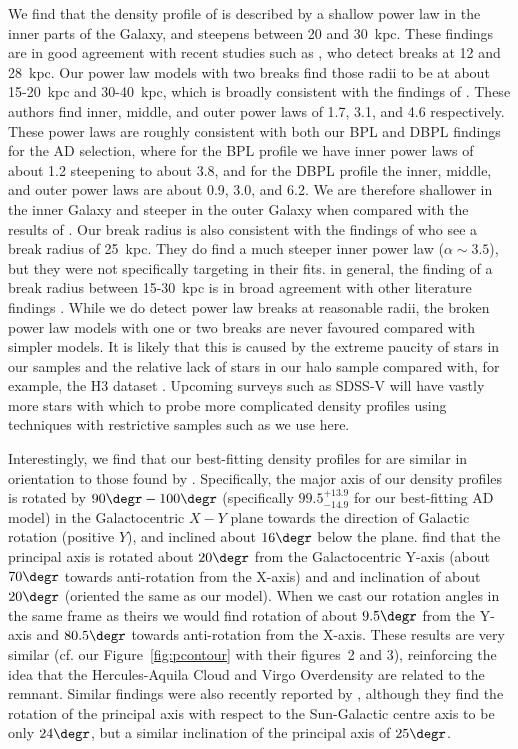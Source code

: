 We find that the density profile of \gse is described by a shallow power law in the inner parts of the Galaxy, and steepens between 20 and 30~kpc. These findings are in good agreement with recent studies such as \textcite{han22}, who detect breaks at 12 and 28~kpc. Our power law models with two breaks find those radii to be at about 15-20~kpc and 30-40~kpc, which is broadly consistent with the findings of \textcite{han22}. These authors find inner, middle, and outer power laws of 1.7, 3.1, and 4.6 respectively. These power laws are roughly consistent with both our BPL and DBPL findings for the AD selection, where for the BPL profile we have inner power laws of about 1.2 steepening to about 3.8, and for the DBPL profile the inner, middle, and outer power laws are about 0.9, 3.0, and 6.2. We are therefore shallower in the inner Galaxy and steeper in the outer Galaxy when compared with the results of \textcite{han22}. Our break radius is also consistent with the findings of \cite{mackereth20} who see a break radius of 25~kpc. They do find a much steeper inner power law ($\alpha \sim 3.5$), but they were not specifically targeting \gse in their fits. in general, the finding of a break radius between 15-30~kpc is in broad agreement with other literature findings \parencite{sesar11,deason11,xue15,deason19}. While we do detect power law breaks at reasonable radii, the broken power law models with one or two breaks are never favoured compared with simpler models. It is likely that this is caused by the extreme paucity of stars in our \gse samples and the relative lack of stars in our halo sample compared with, for example, the H3 dataset \parencite{h3}. Upcoming surveys such as SDSS-V \parencite{sdss5} will have vastly more stars with which to probe more complicated density profiles using techniques with restrictive samples such as we use here.

Interestingly, we find that our best-fitting density profiles for \gse are similar in orientation to those found by \textcite{iorio19}. Specifically, the major axis of our density profiles is rotated by $90\degr-100\degr$ (specifically $99.5^{+13.9}_{-14.9}$ for our best-fitting AD model) in the Galactocentric $X-Y$ plane towards the direction of Galactic rotation (positive $Y$), and inclined about $16\degr$ below the plane. \textcite{iorio19} find that the principal axis is rotated about $20\degr$ from the Galactocentric Y-axis (about $70\degr$ towards anti-rotation from the X-axis) and and inclination of about $20\degr$ (oriented the same as our model). When we cast our rotation angles in the same frame as theirs we would find rotation of about $9.5\degr$ from the Y-axis and $80.5\degr$ towards anti-rotation from the X-axis. These results are very similar (cf. our Figure~\ref{fig:pcontour} with their figures~2 and 3), reinforcing the idea that the Hercules-Aquila Cloud and Virgo Overdensity are related to the \gse remnant. Similar findings were also recently reported by \textcite{han22}, although they find the rotation of the principal axis with respect to the Sun-Galactic centre axis to be only $24\degr$, but a similar inclination of the principal axis of $25\degr$.

